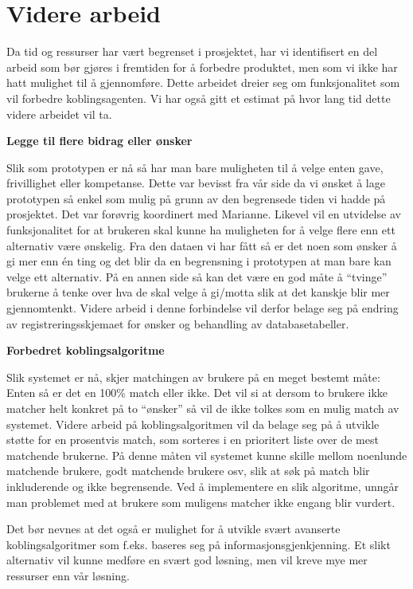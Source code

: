 \section{Videre arbeid}
Da tid og ressurser har vært begrenset i prosjektet, har vi identifisert en del arbeid som bør gjøres i fremtiden for å forbedre produktet, men som vi ikke har hatt mulighet til å gjennomføre. Dette arbeidet dreier seg om funksjonalitet som vil forbedre koblingsagenten. Vi har også gitt et estimat på hvor lang tid dette videre arbeidet vil ta.

{\bf Legge til flere bidrag eller ønsker}

Slik som prototypen er nå så har man bare muligheten til å velge enten gave, frivillighet eller kompetanse. Dette var bevisst fra vår side da vi ønsket å lage prototypen så enkel som mulig på grunn av den begrensede tiden vi hadde på prosjektet. Det var forøvrig koordinert med Marianne. Likevel vil en utvidelse av funksjonalitet for at brukeren skal kunne ha muligheten for å velge flere enn ett alternativ være ønskelig. Fra den dataen vi har fått så er det noen som ønsker å gi mer enn én ting og det blir da en begrensning i prototypen at man bare kan velge ett alternativ. På en annen side så kan det være en god måte å ``tvinge'' brukerne å tenke over hva de skal velge å gi/motta slik at det kanskje blir mer gjennomtenkt. Videre arbeid i denne forbindelse vil derfor belage seg på endring av registreringsskjemaet for ønsker og behandling av databasetabeller.

{\bf Forbedret koblingsalgoritme}

Slik systemet er nå, skjer matchingen av brukere på en meget bestemt måte: Enten så er det en 100\% match eller ikke. Det vil si at dersom to brukere ikke matcher helt konkret på to ``ønsker'' så vil de ikke tolkes som en mulig match av systemet. Videre arbeid på koblingsalgoritmen vil da belage seg på å utvikle støtte for en prosentvis match, som sorteres i en prioritert liste over de mest matchende brukerne. På denne måten vil systemet kunne skille mellom noenlunde matchende brukere, godt matchende brukere osv, slik at søk på match blir inkluderende og ikke begrensende. Ved å implementere en slik algoritme, unngår man problemet med at brukere som muligens matcher ikke engang blir vurdert.

Det bør nevnes at det også er mulighet for å utvikle svært avanserte koblingsalgoritmer som f.eks. baseres seg på informasjonsgjenkjenning. Et slikt alternativ vil kunne medføre en svært god løsning, men vil kreve mye mer ressurser enn vår løsning.

